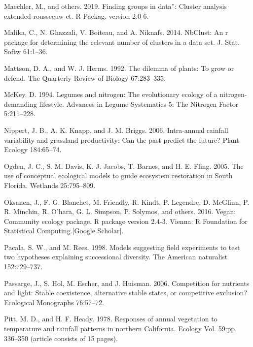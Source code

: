 \documentclass[twoside,12pt,final]{ucthesis-CA2012}
\begin{document}
\begin{ucmainmatter}
\leavevmode\hypertarget{ref-Maechler2019}{}%
Maechler, M., and others. 2019. Finding groups in data'': Cluster analysis extended rousseeuw et. R Packag. version 2.0 6.

\leavevmode\hypertarget{ref-Charrad2014}{}%
Malika, C., N. Ghazzali, V. Boiteau, and A. Niknafs. 2014. NbClust: An r package for determining the relevant number of clusters in a data set. J. Stat. Softw 61:1--36.

\leavevmode\hypertarget{ref-Mattson1992}{}%
Mattson, D. A., and W. J. Herms. 1992. The dilemma of plants: To grow or defend. The Quarterly Review of Biology 67:283--335.

\leavevmode\hypertarget{ref-McKey1994}{}%
McKey, D. 1994. Legumes and nitrogen: The evolutionary ecology of a nitrogen-demanding lifestyle. Advances in Legume Systematics 5: The Nitrogen Factor 5:211--228.

\leavevmode\hypertarget{ref-Nippert2006}{}%
Nippert, J. B., A. K. Knapp, and J. M. Briggs. 2006. Intra-annual rainfall variability and grassland productivity: Can the past predict the future? Plant Ecology 184:65--74.

\leavevmode\hypertarget{ref-Ogden2005}{}%
Ogden, J. C., S. M. Davis, K. J. Jacobs, T. Barnes, and H. E. Fling. 2005. The use of conceptual ecological models to guide ecosystem restoration in South Florida. Wetlands 25:795--809.

\leavevmode\hypertarget{ref-Oksanen2016}{}%
Oksanen, J., F. G. Blanchet, M. Friendly, R. Kindt, P. Legendre, D. McGlinn, P. R. Minchin, R. O'hara, G. L. Simpson, P. Solymos, and others. 2016. Vegan: Community ecology package. R package version 2.4-3. Vienna: R Foundation for Statistical Computing.{[}Google Scholar{]}.

\leavevmode\hypertarget{ref-Pacala1998}{}%
Pacala, S. W., and M. Rees. 1998. Models suggesting field experiments to test two hypotheses explaining successional diversity. The American naturalist 152:729--737.

\leavevmode\hypertarget{ref-Passarge2006}{}%
Passarge, J., S. Hol, M. Escher, and J. Huisman. 2006. Competition for nutrients and light: Stable coexistence, alternative stable states, or competitive exclusion? Ecological Monographs 76:57--72.

\leavevmode\hypertarget{ref-Pitt1978}{}%
Pitt, M. D., and H. F. Heady. 1978. Responses of annual vegetation to temperature and rainfall patterns in northern California. Ecology Vol. 59:pp. 336--350 (article consists of 15 pages).


\end{ucmainmatter}
\end{document}

